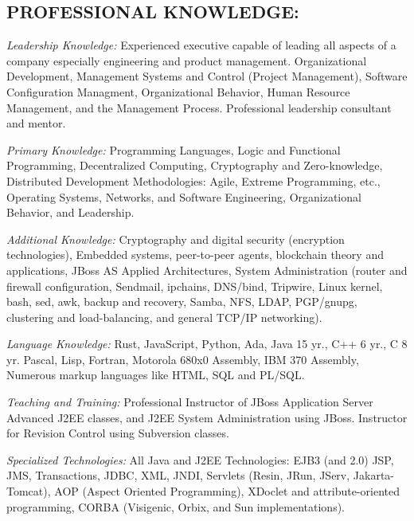\documentclass[10pt]{report}
\begin{document}
\subsection*{PROFESSIONAL KNOWLEDGE:}
\begin{description}


\item{\emph{Leadership Knowledge:}} Experienced executive capable of leading
all aspects of a company especially engineering and product management.
Organizational Development, Management Systems and Control (Project
Management), Software Configuration Managment, Organizational Behavior, Human
Resource Management, and the Management Process.  Professional leadership
consultant and mentor.

\item{\emph{Primary Knowledge:}} Programming Languages, Logic and Functional
Programming, Decentralized Computing, Cryptography and Zero-knowledge,
Distributed Development Methodologies: Agile, Extreme Programming, etc.,
Operating Systems, Networks, and Software Engineering, Organizational Behavior,
and Leadership.

\item{\emph{Additional Knowledge:}} Cryptography and digital security
(encryption technologies), Embedded systems, peer-to-peer agents, blockchain
theory and applications, JBoss AS Applied Architectures, System Administration
(router and firewall configuration, Sendmail, ipchains, DNS/bind, Tripwire,
Linux kernel, bash, sed, awk, backup and recovery, Samba, NFS, LDAP,
PGP/gnupg, clustering and load-balancing, and general TCP/IP networking).

\item{\emph{Language Knowledge:}} Rust, JavaScript, Python, Ada, Java 15 yr.,
C++ 6 yr., C 8 yr.  Pascal, Lisp, Fortran, Motorola 680x0 Assembly, IBM 370
Assembly, Numerous markup languages like HTML, SQL and PL/SQL.

\item{\emph{Teaching and Training:}} Professional Instructor of JBoss
Application Server Advanced J2EE classes, and J2EE System Administration using
JBoss.  Instructor for Revision Control using Subversion classes.

\item{\emph{Specialized Technologies:}} All Java and J2EE Technologies:  EJB3
(and 2.0)  JSP, JMS, Transactions, JDBC, XML, JNDI, Servlets (Resin, JRun,
JServ, Jakarta-Tomcat), AOP (Aspect Oriented Programming), XDoclet and
attribute-oriented programming, CORBA (Visigenic, Orbix, and Sun
implementations).


\end{description}
\end{document}
